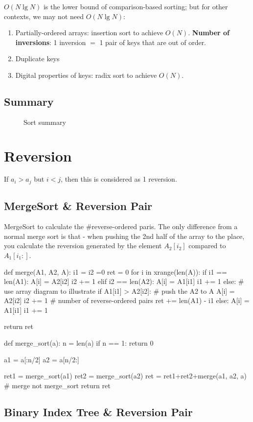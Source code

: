 $O(N\lg N)$ is the lower bound of comparison-based sorting; but for other
contexts, we may not need $O(N \lg N)$:
\begin{enumerate}
\item Partially-ordered arrays: insertion sort to achieve $O(N)$. \textbf{Number of inversions}: 1 inversion $=$ 1 pair of keys that are out
of order.
\item Duplicate keys
\item Digital properties of keys: radix sort to achieve $O(N)$.
\end{enumerate}

\subsection{Summary}
\begin{figure}[hbtp]
\centering
{}
\caption{Sort summary}
\label{fig:trie} 
\end{figure}


\section{Reversion}
If $a_i > a_j$ but $i<j$, then this is considered as 1 reversion. 

\subsection{MergeSort \& Reversion Pair}
MergeSort to calculate the \#reverse-ordered paris. The only difference from a normal
merge sort is that - when pushing the 2nd half of the array to the place, you calculate
the reversion generated by the element $A_2[i_2]$ compared to $A_1[i_1:]$.

\begin{python}
def merge(A1, A2, A):
  i1 = i2 =0
  ret = 0
  for i in xrange(len(A)):
    if i1 == len(A1):
      A[i] = A2[i2]
      i2 += 1
    elif i2 == len(A2):
      A[i] = A1[i1]
      i1 += 1
    else:
      # use array diagram to illustrate
      if A1[i1] > A2[i2]:  # push the A2 to A
        A[i] = A2[i2]
        i2 += 1
        # number of reverse-ordered pairs
        ret += len(A1) - i1
      else:
        A[i] = A1[i1]
        i1 += 1

  return ret

def merge_sort(a):
  n = len(a)
  if n == 1:
    return 0

  a1 = a[:n/2]
  a2 = a[n/2:]

  ret1 = merge_sort(a1)
  ret2 = merge_sort(a2)
  ret = ret1+ret2+merge(a1, a2, a)  # merge not merge_sort
  return ret
\end{python}

\subsection{Binary Index Tree \& Reversion Pair}
